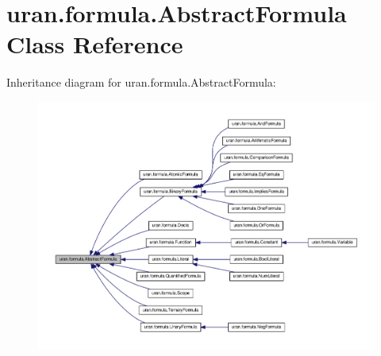\hypertarget{classuran_1_1formula_1_1_abstract_formula}{}\section{uran.\+formula.\+Abstract\+Formula Class Reference}
\label{classuran_1_1formula_1_1_abstract_formula}


Inheritance diagram for uran.\+formula.\+Abstract\+Formula\+:
\nopagebreak
\begin{figure}[H]
\begin{center}
\leavevmode
\includegraphics[width=350pt]{classuran_1_1formula_1_1_abstract_formula__inherit__graph}
\end{center}
\end{figure}
